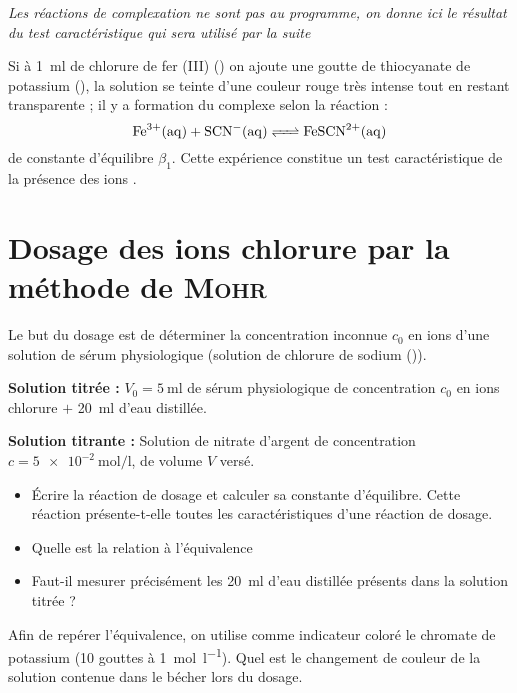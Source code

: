 \documentclass{tp}
\begin{document}
\textit{Les réactions de complexation ne sont pas au programme, on donne ici le résultat du test caractéristique qui sera utilisé par la suite}

Si à \SI{1}{\milli\litre} de chlorure de fer (III) () on ajoute une goutte de thiocyanate de potassium (), la solution se teinte d'une couleur rouge très intense tout en restant transparente ; il y a formation du complexe  selon la réaction :
\begin{equation}
  \ce{Fe^3+(aq) + SCN-(aq) <=> FeSCN^2+(aq)}
\end{equation}
de constante d'équilibre $\beta_1$.
Cette expérience constitue un test caractéristique de la présence des ions .

\section{Dosage des ions chlorure par la méthode de \textsc{Mohr} }%
\label{sec:dosage_des_ions_chlorure_par_la_methode_de_mohr_}

Le but du dosage est de déterminer la concentration inconnue $c_0$ en ions  d'une solution de sérum physiologique (solution de chlorure de sodium ()).

\textbf{Solution titrée : } $V_0=\SI{5}{\milli\litre}$ de sérum physiologique de concentration $c_0$ en ions chlorure $+$ \SI{20}{\milli\litre} d'eau distillée.

\textbf{Solution titrante : } Solution de nitrate d'argent de concentration $c=\SI{5e-2}{\mol\per\litre}$, de volume $V$ versé.

\begin{itemize}
  \item Écrire la réaction de dosage et calculer sa constante d'équilibre. Cette réaction présente-t-elle toutes les caractéristiques d'une réaction de dosage.

  \item Quelle est la relation à l'équivalence

  \item Faut-il mesurer précisément les \SI{20}{\milli\litre} d'eau distillée présents dans la solution titrée ?
\end{itemize}
Afin de repérer l'équivalence, on utilise comme indicateur coloré le chromate de potassium (10 gouttes à \SI{1}{\mol\per\litre}). Quel est le changement de couleur de la solution contenue dans le bécher lors du dosage.
\end{document}
